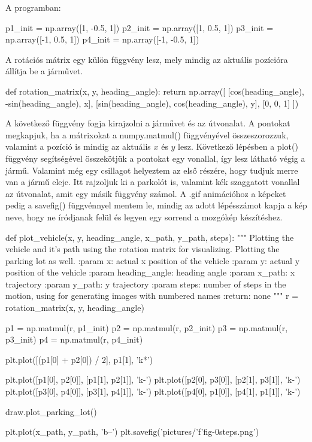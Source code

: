 A programban:
\begin{python}
p1_init = np.array([1, -0.5, 1])
p2_init = np.array([1, 0.5, 1])
p3_init = np.array([-1, 0.5, 1])
p4_init = np.array([-1, -0.5, 1])
\end{python}

\newpage

A rotációs mátrix egy külön függvény lesz, mely mindig az aktuális pozícióra állítja be a járművet.
\begin{python}
def rotation_matrix(x, y, heading_angle):
    return np.array([
        [cos(heading_angle), -sin(heading_angle), x],
        [sin(heading_angle), cos(heading_angle), y],
        [0, 0, 1]
    ])
\end{python}

\bigskip

A következő függvény fogja kirajzolni a járművet és az útvonalat. A pontokat megkapjuk, ha a mátrixokat a numpy.matmul() függvényével összeszorozzuk, valamint a pozíció is mindig az aktuális $ x $ és $ y $ lesz. Következő lépésben a plot() függvény segítségével összekötjük a pontokat egy vonallal, így lesz látható végig a jármű. Valamint még egy csillagot helyeztem az első részére, hogy tudjuk merre van a jármű eleje. Itt rajzoljuk ki a parkolót is, valamint kék szaggatott vonallal az útvonalat, amit egy másik függvény számol. A .gif animációhoz a képeket pedig a savefig() függvénnyel mentem le, mindig az adott lépésszámot kapja a kép neve, hogy ne íródjanak felül és legyen egy sorrend a mozgókép készítéshez.

\begin{python}
def plot_vehicle(x, y, heading_angle, x_path, y_path, steps):
    """
    Plotting the vehicle and it's path using the rotation matrix
    for visualizing.
    Plotting the parking lot as well.
    :param x: actual x position of the vehicle
    :param y: actual y position of the vehicle
    :param heading_angle: heading angle
    :param x_path: x trajectory
    :param y_path: y trajectory
    :param steps: number of steps in the motion, using for generating
    images with numbered names
    :return: none
    """
    r = rotation_matrix(x, y, heading_angle)

    p1 = np.matmul(r, p1_init)
    p2 = np.matmul(r, p2_init)
    p3 = np.matmul(r, p3_init)
    p4 = np.matmul(r, p4_init)

    plt.plot([(p1[0] + p2[0]) / 2], p1[1], 'k*')

    plt.plot([p1[0], p2[0]], [p1[1], p2[1]], 'k-')
    plt.plot([p2[0], p3[0]], [p2[1], p3[1]], 'k-')
    plt.plot([p3[0], p4[0]], [p3[1], p4[1]], 'k-')
    plt.plot([p4[0], p1[0]], [p4[1], p1[1]], 'k-')

    draw.plot_parking_lot()

    plt.plot(x_path, y_path, 'b--')
    plt.savefig('pictures/'f'fig-0{steps}.png')

\end{python}

